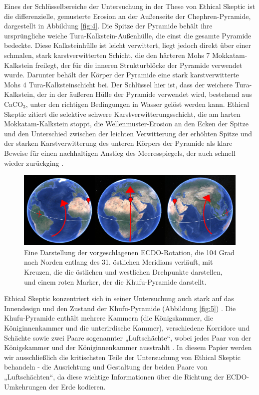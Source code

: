 \documentclass[10pt,twocolumn,letterpaper]{article}
\begin{document}
Eines der Schlüsselbereiche der Untersuchung in der These von Ethical Skeptic ist die differenzielle, gemusterte Erosion an der Außenseite der Chephren-Pyramide, dargestellt in Abbildung \ref{fig:4}. Die Spitze der Pyramide behält ihre ursprüngliche weiche Tura-Kalkstein-Außenhülle, die einst die gesamte Pyramide bedeckte. Diese Kalksteinhülle ist leicht verwittert, liegt jedoch direkt über einer schmalen, stark karstverwitterten Schicht, die den härteren Mohs 7 Mokkatam-Kalkstein freilegt, der für die inneren Strukturblöcke der Pyramide verwendet wurde. Darunter behält der Körper der Pyramide eine stark karstverwitterte Mohs 4 Tura-Kalksteinschicht bei. Der Schlüssel hier ist, dass der weichere Tura-Kalkstein, der in der äußeren Hülle der Pyramide verwendet wird, bestehend aus CaCO$_3$, unter den richtigen Bedingungen in Wasser gelöst werden kann. Ethical Skeptic zitiert die selektive schwere Karstverwitterungsschicht, die am harten Mokkatam-Kalkstein stoppt, die Wellenmuster-Erosion an den Ecken der Spitze und den Unterschied zwischen der leichten Verwitterung der erhöhten Spitze und der starken Karstverwitterung des unteren Körpers der Pyramide als klare Beweise für einen nachhaltigen Anstieg des Meeresspiegels, der auch schnell wieder zurückging \cite{27}.

\begin{figure}[t]
\begin{center}
\includegraphics[width=1\textwidth]{drawing.jpg}
\end{center}
   \caption{Eine Darstellung der vorgeschlagenen ECDO-Rotation, die 104 Grad nach Norden entlang des 31. östlichen Meridians verläuft, mit Kreuzen, die die östlichen und westlichen Drehpunkte darstellen, und einem roten Marker, der die Khufu-Pyramide darstellt.}
\label{fig:6}
\end{figure}

Ethical Skeptic konzentriert sich in seiner Untersuchung auch stark auf das Innendesign und den Zustand der Khufu-Pyramide (Abbildung \ref{fig:5}) \cite{28}. Die Khufu-Pyramide enthält mehrere Kammern (die Königskammer, die Königinnenkammer und die unterirdische Kammer), verschiedene Korridore und Schächte sowie zwei Paare sogenannter „Luftschächte“, wobei jedes Paar von der Königskammer und der Königinnenkammer ausstrahlt \cite{29,30}. In diesem Papier werden wir ausschließlich die kritischsten Teile der Untersuchung von Ethical Skeptic behandeln - die Ausrichtung und Gestaltung der beiden Paare von „Luftschächten“, da diese wichtige Informationen über die Richtung der ECDO-Umkehrungen der Erde kodieren.
\end{document}
